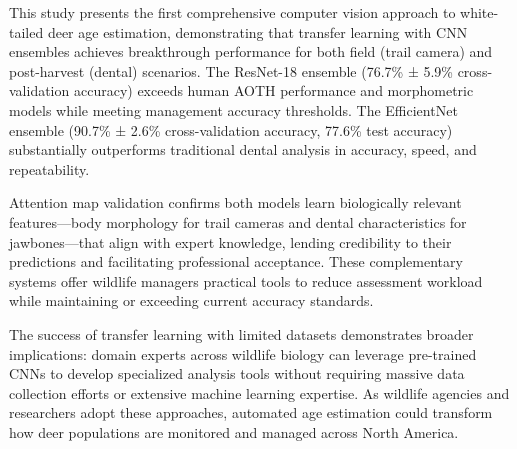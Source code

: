 \documentclass[11pt]{article}
\begin{document}
This study presents the first comprehensive computer vision approach to white-tailed deer age estimation, demonstrating that transfer learning with CNN ensembles achieves breakthrough performance for both field (trail camera) and post-harvest (dental) scenarios. The ResNet-18 ensemble (76.7\% ± 5.9\% cross-validation accuracy) exceeds human AOTH performance and morphometric models while meeting management accuracy thresholds. The EfficientNet ensemble (90.7\% ± 2.6\% cross-validation accuracy, 77.6\% test accuracy) substantially outperforms traditional dental analysis in accuracy, speed, and repeatability.

Attention map validation confirms both models learn biologically relevant features—body morphology for trail cameras and dental characteristics for jawbones—that align with expert knowledge, lending credibility to their predictions and facilitating professional acceptance. These complementary systems offer wildlife managers practical tools to reduce assessment workload while maintaining or exceeding current accuracy standards.

The success of transfer learning with limited datasets demonstrates broader implications: domain experts across wildlife biology can leverage pre-trained CNNs to develop specialized analysis tools without requiring massive data collection efforts or extensive machine learning expertise. As wildlife agencies and researchers adopt these approaches, automated age estimation could transform how deer populations are monitored and managed across North America.
\end{document}
